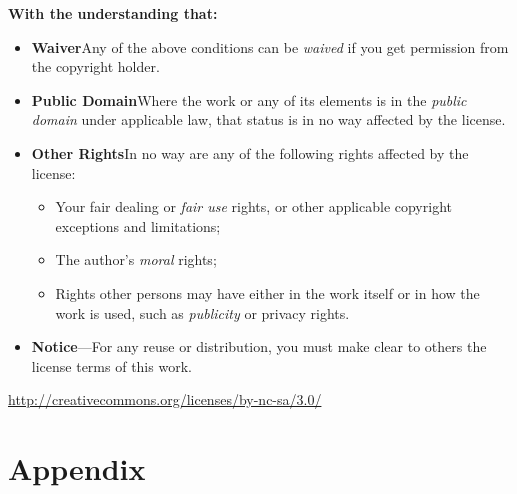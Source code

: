 \documentclass[fontsize=10pt,twoside,BCOR=12mm,DIV=calc]{scrbook}
\begin{document}
\textbf{With the understanding that:}
\begin{itemize}
  \item[]\textbf{Waiver}\dash{}Any of the above conditions can be \emph{waived} if
      you get permission from the copyright holder.
  \item[]\textbf{Public Domain}\dash{}Where the work or any of its elements is in
      the \emph{public domain} under applicable law, that status is in no way
      affected by the license.
  \item[]\textbf{Other Rights}\dash{}In no way are any of the following rights
      affected by the license:
  \begin{itemize}
    \item Your fair dealing or \emph{fair use} rights, or other applicable
        copyright exceptions and limitations;
    \item The author's \emph{moral} rights;
    \item Rights other persons may have either in the work itself or in how the
        work is used, such as \emph{publicity} or privacy rights.
  \end{itemize}
  \item[]\textbf{Notice}---For any reuse or distribution, you must make clear
      to others the license terms of this work.
\end{itemize}
\begin{center}
  \url{http://creativecommons.org/licenses/by-nc-sa/3.0/}

  \cc{}
\end{center}


\setcounter{tocdepth}{3}
\tableofcontents

\listoftables

\listoffigures



%
\part{Appendix}

%

\printindex



\end{document}
